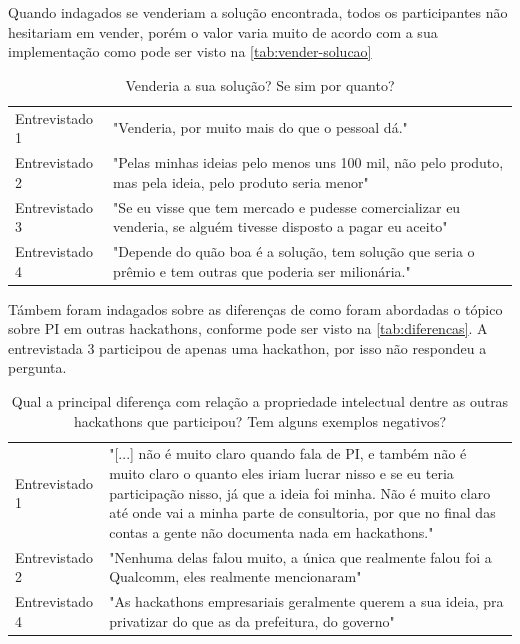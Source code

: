 Quando indagados se venderiam a solução encontrada, todos os participantes não hesitariam em vender, porém o valor varia muito de acordo com a sua implementação como pode ser visto na \autoref{tab:vender-solucao}

\begin{table}[H]
\centering
\caption{Venderia a sua solução? Se sim por quanto? }
\label{tab:vender-solucao}
\begin{tabular}{l|p{}}
Entrevistado 1 & "Venderia, por muito mais do que o pessoal dá."                                                            \\
Entrevistado 2 & "Pelas minhas ideias pelo menos uns 100 mil, não pelo produto, mas pela ideia, pelo produto seria menor"   \\
Entrevistado 3 & "Se eu visse que tem mercado e pudesse comercializar eu venderia, se alguém tivesse disposto a pagar eu aceito" \\
Entrevistado 4 & "Depende do quão boa é a solução, tem solução que seria o prêmio e tem outras que poderia ser milionária."
\end{tabular}
\end{table}


Támbem foram indagados sobre as diferenças de como foram abordadas o tópico sobre PI em outras hackathons, conforme pode ser visto na \autoref{tab:diferencas}.
A entrevistada 3 participou de apenas uma hackathon, por isso não respondeu a pergunta.

\begin{table}[H]
\centering
\caption{Qual a principal diferença com relação a propriedade intelectual dentre as outras hackathons que participou? Tem alguns exemplos negativos? }
\label{tab:diferencas}
\begin{tabular}{l|p{}}
Entrevistado 1 &
  "{[}...{]} não é muito claro quando fala de PI, e também não é muito claro o quanto eles iriam lucrar nisso e se eu teria participação nisso, já que a ideia foi minha. Não é muito claro até onde vai a minha parte de consultoria, por que no final das contas a gente não documenta nada em hackathons." \\
Entrevistado 2 & "Nenhuma delas falou muito, a única que realmente falou foi a Qualcomm, eles realmente mencionaram"            \\

Entrevistado 4 & "As hackathons empresariais geralmente querem a sua ideia, pra privatizar do que as da prefeitura, do governo"
\end{tabular}
\end{table}


